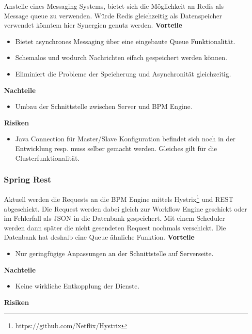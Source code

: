 Anstelle eines Messaging Systems, bietet sich die Möglichkeit an Redis als Message queue zu verwenden. Würde Redis gleichzeitig als Datenspeicher verwendet könntem hier Synergien genutz werden.
\newline
\newline
\textbf{Vorteile}
\begin{itemize}
	\item Bietet asynchrones Messaging über eine eingebaute Queue Funktionalität.
	\item Schemalos und wodurch Nachrichten eifach gespeichert werden können.
	\item Eliminiert die Probleme der Speicherung und Asynchronität gleichzeitig.
\end{itemize}
\textbf{Nachteile}
\begin{itemize}
	\item Umbau der Schnittstelle zwischen Server und BPM Engine.
\end{itemize}
\textbf{Risiken}
\begin{itemize}
	\item Java Connection für Master/Slave Konfiguration befindet sich noch in der Entwicklung resp. muss selber gemacht werden. Gleiches gilt für die Clusterfunktionalität.
\end{itemize}

\subsubsection{Spring Rest}

Aktuell werden die Requests an die BPM Engine mittels Hystrix\footnote{https://github.com/Netflix/Hystrix} und REST abgeschickt. Die Request werden dabei gleich zur Workflow Engine geschickt oder im Fehlerfall als JSON in die Datenbank gespeichert. Mit einem Scheduler werden dann später die nicht gesendeten Request nochmals verschickt. Die Datenbank hat deshalb eine Queue ähnliche Funktion.
\newline
\newline
\textbf{Vorteile}
\begin{itemize}
	\item Nur geringfügige Anpassungen an der Schnittstelle auf Serverseite.
\end{itemize}
\textbf{Nachteile}
\begin{itemize}
	\item Keine wirkliche Entkopplung der Dienste.
\end{itemize}
\textbf{Risiken}

